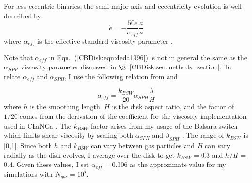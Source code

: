 For less eccentric binaries, the semi-major axis and eccentricity evolution is well-described by 
\begin{equation}
\label{CBDisk:eqn:deda1996}
\dot{e} = -\frac{50e}{\alpha_{eff}}\frac{\dot{a}}{a}
\end{equation}
where $\alpha_{eff}$ is the effective standard viscosity parameter \citep{Artymowicz1996b,Dermine2013}.  

Note that $\alpha_{eff}$ in Eqn.~(\ref{CBDisk:eqn:deda1996}) is not in 
general the same as the $\alpha_{SPH}$ viscosity parameter discussed in $\S$~\ref{CBDisk:sec:methods_section}.  To relate $\alpha_{eff}$ and $\alpha_{SPH}$, I use the following relation from \citet{Lodato2010} and \citet{Meru2012}

\begin{equation}
\label{CBDisk:eqn:alphas}
\alpha_{eff} = \frac{k_{BSW}}{20} \alpha_{SPH} \frac{h}{H}
\end{equation}
where $h$ is the smoothing length, $H$ is the disk aspect ratio, and the factor of $1/20$ comes from the \citet{Meru2012} derivation of the coefficient for 
the \citet{Monaghan1983} viscosity implementation used in ChaNGa \citep{Murray1996}.  The $k_{BSW}$ factor arises from my usage of the  Balsara switch which 
limits shear viscosity by scaling both $\alpha_{SPH}$ and $\beta_{SPH}$ \citep{Balsara1995}.  The range of $k_{BSW}$ is [0,1].  Since both $h$ and $k_{BSW}$ 
can vary between gas particles and $H$ can vary radially as the disk evolves, I average over the disk to get $k_{BSW} = 0.3$ and $h/H$ = 0.4.  Given these 
values, I set $\alpha_{eff} = 0.006$ as the approximate value for my simulations with $N_{gas} = 10^5$.


